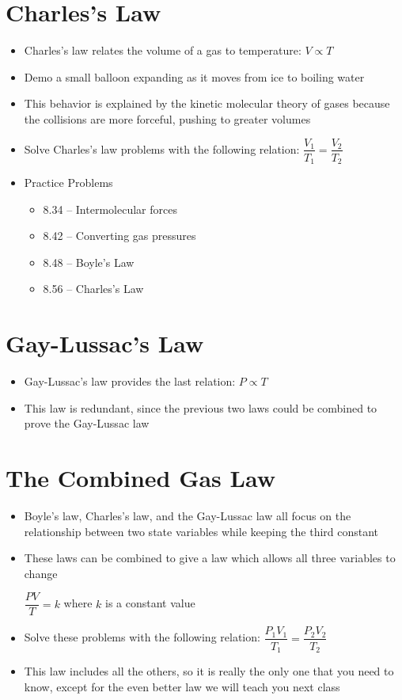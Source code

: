 \documentclass[12pt, openany, letterpaper]{memoir}
\begin{document}
\section{Charles's Law}
\begin{itemize}
	\item Charles's law relates the volume of a gas to temperature: $V\propto T$
	\item Demo a small balloon expanding as it moves from ice to boiling water
	\item This behavior is explained by the kinetic molecular theory of gases because the collisions are more forceful, pushing to greater volumes
	\item Solve Charles's law problems with the following relation: $\dfrac{V_1}{T_1}=\dfrac{V_2}{T_2}$
	\item Practice Problems
	\begin{itemize}
		\item 8.34 -- Intermolecular forces
		\item 8.42 -- Converting gas pressures
		\item 8.48 -- Boyle's Law
		\item 8.56 -- Charles's Law
	\end{itemize}
\end{itemize}
\section{Gay-Lussac's Law}
\begin{itemize}
	\item Gay-Lussac's law provides the last relation: $P\propto T$
	\item This law is redundant, since the previous two laws could be combined to prove the Gay-Lussac law
\end{itemize}
\section{The Combined Gas Law}
\begin{itemize}
	\item Boyle's law, Charles's law, and the Gay-Lussac law all focus on the relationship between two state variables while keeping the third constant
	\item These laws can be combined to give a law which allows all three variables to change
	
	$\dfrac{PV}{T} = k$ where $k$ is a constant value
	\item Solve these problems with the following relation: $\dfrac{P_1V_1}{T_1}=\dfrac{P_2V_2}{T_2}$
	\item This law includes all the others, so it is really the only one that you need to know, except for the even better law we will teach you next class
\end{itemize}
\end{document}

